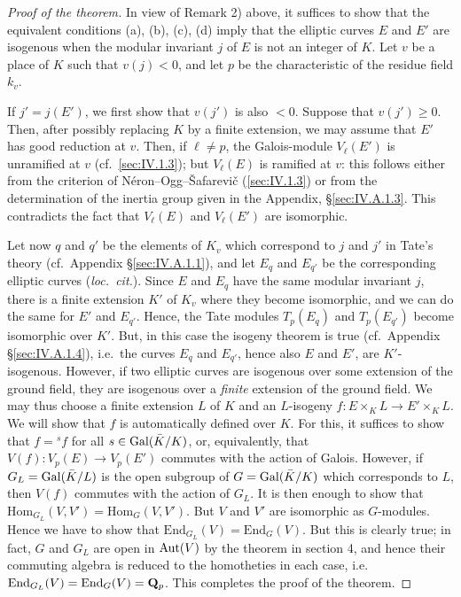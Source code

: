 \begin{proof}[Proof of the theorem]
In view of Remark 2) above, it suffices to show that the equivalent
conditions (a), (b), (c), (d) imply that the elliptic curves $E$ and $E'$
are isogenous when the modular invariant $j$ of $E$ is not an integer of
$K$.  Let $v$ be a place of $K$ such that $v(j) < 0$, and let $p$ be the
characteristic of the residue field $k_v$.

If $j' = j(E')$, we first show that $v(j')$ is also $< 0$.  Suppose that
$v(j') \geq 0$.  Then, after possibly replacing $K$ by a finite extension,
we may assume that $E'$ has good reduction at $v$.  Then, if
$\ell \neq p$, the Galois-module $V_\ell(E')$ is unramified at $v$
(cf.~\ref{sec:IV.1.3}); but $V_\ell(E)$ is ramified at $v$: this follows either from
the criterion of N\'eron--Ogg--\v{S}afarevi\v{c} (\ref{sec:IV.1.3}) or from the
determination of the inertia group given in the Appendix,
\S\ref{sec:IV.A.1.3}.  This contradicts the fact that $V_\ell(E)$ and
$V_\ell(E')$ are isomorphic.

Let now $q$ and $q'$ be the elements of $K_v$ which correspond to $j$ and
$j'$ in Tate's theory (cf.~Appendix \S\ref{sec:IV.A.1.1}), and let $E_q$
and $E_{q'}$ be the corresponding elliptic curves (\emph{loc.~cit.}).
Since $E$ and $E_q$ have the same modular invariant $j$, there is a
finite extension $K'$ of $K_v$ where they become isomorphic, and we can
do the same for $E'$ and $E_{q'}$.  Hence, the Tate modules $T_p(E_q)$
and $T_p(E_{q'})$ become isomorphic over $K'$.  But, in this case the
isogeny theorem is true (cf.~Appendix \S\ref{sec:IV.A.1.4}), i.e.~the
curves $E_q$ and $E_{q'}$, hence also $E$ and $E'$, are $K'$-isogenous.
However, if two elliptic curves are isogenous over some extension of the
ground field, they are isogenous over a \emph{finite} extension of the
ground field.  We may thus choose a finite extension $L$ of $K$ and an
$L$-isogeny $f\colon E \times_K L \to E' \times_K L$.  We will show that
$f$ is automatically defined over $K$.  For this, it suffices to show
that $f = {}^s f$ for all $s \in \mathrm{Gal}(\bar{K}/K)$, or, equivalently, that
$V(f)\colon V_p(E) \to V_p(E')$ commutes with the action of Galois.
However, if $G_L = \mathrm{Gal}(\bar{K}/L)$ is the open subgroup of
$G = \mathrm{Gal}(\bar{K}/K)$ which corresponds to $L$, then $V(f)$ commutes with
the action of $G_L$.  It is then enough to show that
$\mathrm{Hom}_{G_L}(V,V') = \mathrm{Hom}_G(V,V')$.  But $V$ and $V'$ are
isomorphic as $G$-modules.  Hence we have to show that
$\mathrm{End}_{G_L}(V) = \mathrm{End}_G(V)$.  But this is clearly true; in
fact, $G$ and $G_L$ are open in $\mathrm{Aut}(V)$ by the theorem in section 4,
and hence their commuting algebra is reduced to the homotheties in each
case, i.e.~$\mathrm{End}_{G_L}(V) = \mathrm{End}_G(V) = \mathbf{Q}_p$.  This
completes the proof of the theorem.
\end{proof}

